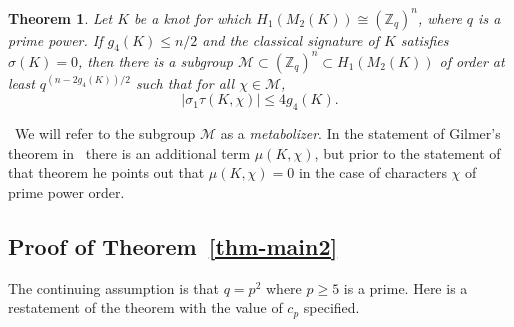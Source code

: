 \documentclass[10pt,oneside]{amsart}
\def\Z{{\mathbb Z}}
\def\calm{\mathcal{M}}
\newtheorem{theorem}{Theorem}
\theoremstyle{definition}
\begin{document}
\begin{theorem}\label{thm:bound2}  Let $K$ be   a knot for which  $H_1(M_2(K)  ) \cong (\Z_q)^n   $, where  $q$ is a prime power.   If  $g_4(K)   \le n/2$ and the classical signature of $K$ satisfies $\sigma(K) = 0$,  then there is a subgroup $\calm \subset   (\Z_{q})^n \subset H_1(M_2(K))$ of order at least
$q^{(n- 2g_4(K))/2}$ such that for all $\chi \in \calm$,
\[ \big| \sigma_1 \tau (K, \chi) \big| \le 4g_4(K).\]
\end{theorem}\
\noindent  We will refer to the subgroup $\calm$ as a {\it metabolizer}.  In the statement of Gilmer's theorem in~\cite{MR656619} there is an additional term $\mu(K, \chi)$, but prior to the statement of that theorem he points out that $\mu(K, \chi) =  0$ in the case of characters $\chi$ of prime  power order.

\subsection{Proof of Theorem~\ref{thm-main2}}
The continuing assumption is that $q = p^2$ where $p \ge 5$ is a prime. Here is a restatement of the theorem with the value of $c_p$ specified.

\medskip
\end{document}
